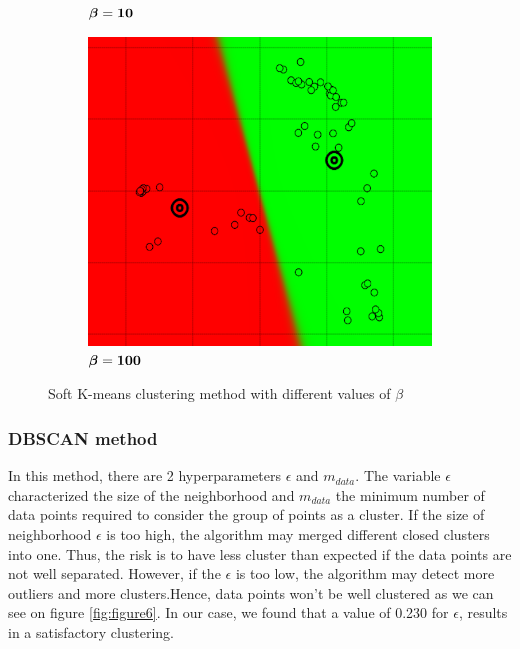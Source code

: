 \begin{figure}[!h]
\begin{subfigure}[h]{0.30\textwidth}
	\caption{$\boldsymbol \beta \bf = 10$}
    \end{subfigure}
    \begin{subfigure}[h]{0.30\textwidth}
    \centering
    \includegraphics[height=0.08\textheight]{./clustering/soft_k_mean_beta_100.png}
	\caption{$\boldsymbol \beta \bf = 100$}
    \end{subfigure}
\caption{Soft K-means clustering method with different values of $\beta$}
\label{fig:figure5}
\end{figure}

\subsubsection{DBSCAN method}
In this method, there are 2 hyperparameters $\epsilon$ and $m_{data}$. The variable $\epsilon$ characterized the size of the neighborhood and $m_{data}$ the minimum number of data points required to consider the group of points as a cluster. If the size of neighborhood $\epsilon$ is too high, the algorithm may merged different closed clusters into one. Thus, the risk is to have less cluster than expected if the data points are not well separated. However, if the $\epsilon$ is too low, the algorithm may detect more outliers and more clusters.Hence, data points won't be well clustered as we can see on figure \ref{fig:figure6}. In our case, we found that a value of 0.230 for $\epsilon$, results in a satisfactory clustering. 

